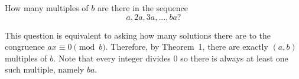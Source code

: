  How many multiples of $b$ are there in the sequence
\begin{equation*}
  a, 2a, 3a, \dots, ba?
\end{equation*}
\begin{solution}
  This question is equivalent to asking how many solutions there are
  to the congruence $ax \equiv 0\pmod b$. Therefore, by Theorem~1,
  there are exactly $(a,b)$ multiples of $b$. Note that every integer
  divides $0$ so there is always at least one such multiple, namely
  $ba$.
\end{solution}
